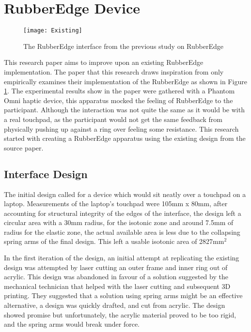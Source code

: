\section{RubberEdge Device}

\begin{figure}[h]
    \centering
    \texttt{[image: Existing]}
    \caption{The RubberEdge interface from the previous study on RubberEdge \protect\cite{Casiez2007RubberEdge}}
    \label{fig:existing}
\end{figure}

This research paper aims to improve upon an existing RubberEdge implementation. The paper\cite{Casiez2007RubberEdge} that this research draws inspiration from only empirically examines their implementation of the RubberEdge as shown in Figure \ref{fig:existing}. The experimental results show in the paper were gathered with a Phantom Omni haptic device\cite{GeomagicOverview}, this apparatus mocked the feeling of RubberEdge to the participant. Although the interaction was not quite the same as it would be with a real touchpad, as the participant would not get the same feedback from physically pushing up against a ring over feeling some resistance. This research started with creating a RubberEdge apparatus using the existing design from the source paper.

\subsection{Interface Design}
The initial design called for a device which would sit neatly over a touchpad on a laptop. Measurements of the laptop's touchpad were 105mm x 80mm, after accounting for structural integrity of the edges of the interface, the design left a circular area with a 30mm radius, for the isotonic zone and around 7.5mm of radius for the elastic zone, the actual available area is less due to the collapsing spring arms of the final design. This left a usable isotonic area of 2827mm$^2$

In the first iteration of the design, an initial attempt at replicating the existing design was attempted by laser cutting an outer frame and inner ring out of acrylic. This design was abandoned in favour of a solution suggested by the mechanical technician that helped with the laser cutting and subsequent 3D printing. They suggested that a solution using spring arms might be an effective alternative, a design was quickly drafted, and cut from acrylic. The design showed promise but unfortunately, the acrylic material proved to be too rigid, and the spring arms would break under force.

